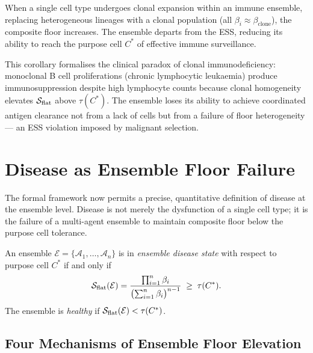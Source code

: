 \begin{corollary}
\label{cor:ch02b-clonal}
When a single cell type undergoes clonal expansion within an immune ensemble,
replacing heterogeneous lineages with a clonal population (all $\beta_i
\approx \beta_{\mathrm{clone}}$), the composite floor increases.  The ensemble
departs from the ESS, reducing its ability to reach the purpose cell $C^*$ of
effective immune surveillance.
\end{corollary}

This corollary formalises the clinical paradox of clonal immunodeficiency:
monoclonal B cell proliferations (chronic lymphocytic leukaemia) produce
immunosuppression despite high lymphocyte counts because clonal homogeneity
elevates $\mathcal{S}_{\mathrm{flat}}$ above $\tau(C^*)$.  The ensemble loses its
ability to achieve coordinated antigen clearance not from a lack of cells but
from a failure of floor heterogeneity — an ESS violation imposed by malignant
selection.

\section{Disease as Ensemble Floor Failure}
\label{sec:ch02b-disease-ensemble}

The formal framework now permits a precise, quantitative definition of disease
at the ensemble level.  Disease is not merely the dysfunction of a single cell
type; it is the failure of a multi-agent ensemble to maintain composite floor
below the purpose cell tolerance.

\begin{definition}
\label{def:ch02b-ensemble-disease}
An ensemble $\mathcal{E} = \{\mathcal{A}_1, \ldots, \mathcal{A}_n\}$ is in
\emph{ensemble disease state} with respect to purpose cell $C^*$ if and only
if
\begin{equation}
  \mathcal{S}_{\mathrm{flat}}(\mathcal{E})
  = \frac{\prod_{i=1}^n \beta_i}{\bigl(\sum_{i=1}^n \beta_i\bigr)^{n-1}}
  \;\geq\; \tau(C^*).
  \label{eq:ch02b-disease-criterion}
\end{equation}
The ensemble is \emph{healthy} if $\mathcal{S}_{\mathrm{flat}}(\mathcal{E}) <
\tau(C^*)$.
\end{definition}

\subsection{Four Mechanisms of Ensemble Floor Elevation}

